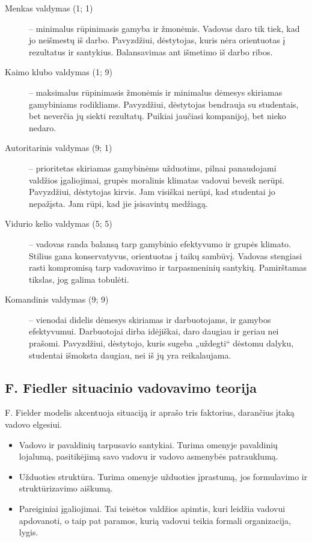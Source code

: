 \begin{description}
  \item[Menkas valdymas (1; 1)] – minimalus rūpinimasis gamyba ir žmonėmis.
    Vadovas daro tik tiek, kad jo neišmestų iš darbo. Pavyzdžiui,
    dėstytojas, kuris nėra orientuotas į rezultatus ir santykius.
    Balansavimas ant išmetimo iš darbo ribos.
  \item[Kaimo klubo valdymas (1; 9)] – maksimalus rūpinimasis žmonėmis
    ir minimalus dėmesys skiriamas gamybiniams rodikliams. Pavyzdžiui,
    dėstytojas bendrauja su studentais, bet neverčia jų siekti
    rezultatų. Puikiai jaučiasi kompanijoj, bet nieko nedaro.
  \item[Autoritarinis valdymas (9; 1)] – prioritetas skiriamas gamybinėms
    užduotims, pilnai panaudojami valdžios įgaliojimai, grupės moralinis
    klimatas vadovui beveik nerūpi. Pavyzdžiui, dėstytojas kirvis.
    Jam visiškai nerūpi, kad studentai jo nepažįsta. Jam rūpi, kad jie
    įsisavintų medžiagą.
  \item[Vidurio kelio valdymas (5; 5)] – vadovas randa balansą tarp
    gamybinio efektyvumo ir grupės klimato. Stilius gana konservatyvus,
    orientuotas į taikų sambūvį. Vadovas stengiasi rasti kompromisą
    tarp vadovavimo ir tarpasmeninių santykių. Pamirštamas tikslas,
    jog galima tobulėti.
  \item[Komandinis valdymas (9; 9)] – vienodai didelis dėmesys skiriamas
    ir darbuotojams, ir gamybos efektyvumui. Darbuotojai dirba idėjiškai,
    daro daugiau ir geriau nei prašomi. Pavyzdžiui, dėstytojo, kuris
    sugeba „uždegti“ dėstomu dalyku, studentai išmoksta daugiau, nei
    iš jų yra reikalaujama.
\end{description}

\subsection{F. Fiedler situacinio vadovavimo teorija}

F. Fielder modelis akcentuoja situaciją ir aprašo tris faktorius,
darančius įtaką vadovo elgesiui.
\begin{itemize}
  \item Vadovo ir pavaldinių tarpusavio santykiai. Turima omenyje
    pavaldinių lojalumą, pasitikėjimą savo vadovu ir vadovo
    asmenybės patrauklumą.
  \item Užduoties struktūra. Turima omenyje užduoties įprastumą,
    jos formulavimo ir struktūrizavimo aiškumą.
  \item Pareiginiai įgaliojimai. Tai teisėtos valdžios apimtis, kuri
    leidžia vadovui apdovanoti, o taip pat paramos, kurią vadovui
    teikia formali organizacija, lygis.
\end{itemize}

